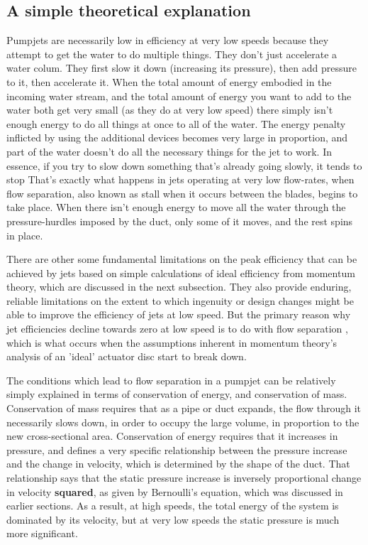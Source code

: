 \documentclass{article}\usepackage[]{graphicx}\usepackage[]{color}
\begin{document}
\subsection{A simple theoretical explanation}

Pumpjets are necessarily low in efficiency at very low speeds because they attempt to get the water to do multiple things.  They don't just accelerate a water colum.  They first slow it down (increasing its pressure), then add pressure to it, then accelerate it.  When the total amount of energy embodied in the incoming water stream, and the total amount of energy you want to add to the water both get very small (as they do at very low speed) there simply isn't enough energy to do all things at once to all of the water.  The energy penalty inflicted by using the additional devices becomes very large in proportion, and part of the water doesn't do all the necessary things for the jet to work.  In essence, if you try to slow down something that's already going slowly, it tends to stop  That's exactly what happens in jets operating at very low flow-rates, when flow separation, also known as stall when it occurs between the blades, begins to take place.  When there isn't enough energy to move all the water through the pressure-hurdles imposed by the duct, only some of it moves, and the rest spins in place.

There are other some fundamental limitations on the peak efficiency that can be achieved by jets based on simple calculations of ideal efficiency from momentum theory, which are discussed in the next subsection.  They also provide enduring, reliable limitations on the extent to which ingenuity or design changes might be able to improve the efficiency of jets at low speed. But the primary reason why jet efficiencies decline towards zero at low speed is to do with flow separation \parencite{fujisawa1995}, which is what occurs when the assumptions inherent in momentum theory's analysis of an 'ideal' actuator disc start to break down.

The conditions which lead to flow separation in a pumpjet can be relatively simply explained in terms of conservation of energy, and conservation of mass. Conservation of mass requires that as a pipe or duct expands, the flow through it necessarily slows down, in order to occupy the large volume, in proportion to the new cross-sectional area.  Conservation of energy requires that it increases in pressure, and defines a very specific relationship between the pressure increase and the change in velocity, which is determined by the shape of the duct.  That relationship says that the static pressure increase is inversely proportional change in velocity \textbf{squared}, as given by Bernoulli's equation, which was discussed in earlier sections.  As a result, at high speeds, the total energy of the system is dominated by its velocity, but at very low speeds the static pressure is much more significant.
\end{document}
